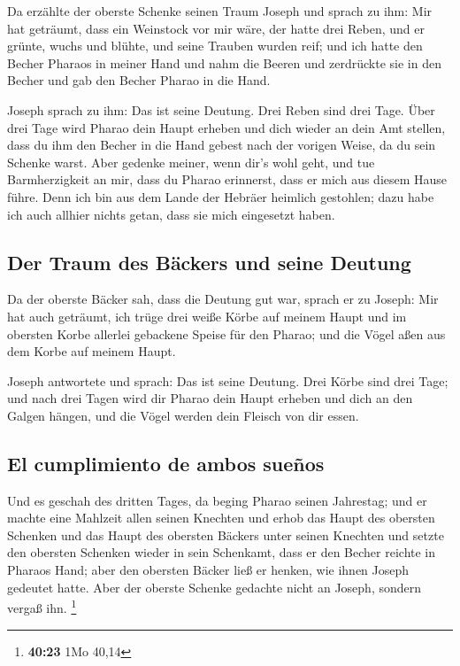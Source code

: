  Da erzählte der oberste Schenke seinen Traum Joseph und
sprach zu ihm: Mir hat geträumt, dass ein Weinstock vor mir wäre,
 der hatte drei Reben, und er grünte, wuchs und blühte,
und seine Trauben wurden reif;  und ich hatte den Becher
Pharaos in meiner Hand und nahm die Beeren und zerdrückte sie in den
Becher und gab den Becher Pharao in die Hand.

 Joseph sprach zu ihm: Das ist seine Deutung. Drei Reben
sind drei Tage.  Über drei Tage wird Pharao dein Haupt
erheben und dich wieder an dein Amt stellen, dass du ihm den Becher in
die Hand gebest nach der vorigen Weise, da du sein Schenke warst.
 Aber gedenke meiner, wenn dir's wohl geht, und tue
Barmherzigkeit an mir, dass du Pharao erinnerst, dass er mich aus diesem
Hause führe.  Denn ich bin aus dem Lande der Hebräer
heimlich gestohlen; dazu habe ich auch allhier nichts getan, dass sie
mich eingesetzt haben.

\hypertarget{der-traum-des-buxe4ckers-und-seine-deutung}{%
\subsection{Der Traum des Bäckers und seine
Deutung}\label{der-traum-des-buxe4ckers-und-seine-deutung}}

 Da der oberste Bäcker sah, dass die Deutung gut war,
sprach er zu Joseph: Mir hat auch geträumt, ich trüge drei weiße Körbe
auf meinem Haupt  und im obersten Korbe allerlei
gebackene Speise für den Pharao; und die Vögel aßen aus dem Korbe auf
meinem Haupt.

 Joseph antwortete und sprach: Das ist seine Deutung.
Drei Körbe sind drei Tage;  und nach drei Tagen wird dir
Pharao dein Haupt erheben und dich an den Galgen hängen, und die Vögel
werden dein Fleisch von dir essen.

\hypertarget{el-cumplimiento-de-ambos-sueuxf1os}{%
\subsection{El cumplimiento de ambos
sueños}\label{el-cumplimiento-de-ambos-sueuxf1os}}

 Und es geschah des dritten Tages, da beging Pharao
seinen Jahrestag; und er machte eine Mahlzeit allen seinen Knechten und
erhob das Haupt des obersten Schenken und das Haupt des obersten Bäckers
unter seinen Knechten  und setzte den obersten Schenken
wieder in sein Schenkamt, dass er den Becher reichte in Pharaos Hand;
 aber den obersten Bäcker ließ er henken, wie ihnen
Joseph gedeutet hatte.  Aber der oberste Schenke gedachte
nicht an Joseph, sondern vergaß ihn. \footnote{\textbf{40:23} 1Mo 40,14}

